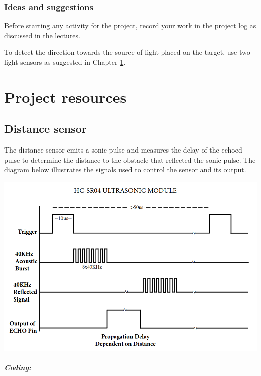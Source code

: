 \documentclass[12pt]{book}
\begin{document}
\subsection{Ideas and suggestions}

\begin{compactenum}[1)]
  \item Before starting any activity for the project, record your work
    in the project log as discussed in the lectures.
  \item To detect the direction towards the source of light placed on
    the target, use two light sensors as suggested in Chapter
    \ref{resource.ch}. 
\end{compactenum}


\chapter{Project resources}\label{resource.ch}

\section{Distance sensor}

The distance sensor emits a sonic pulse and measures the delay of the
echoed pulse to determine the distance to the obstacle that reflected
the sonic pulse. The diagram below illustrates the signals used to
control the sensor and its output.

\includegraphics[width=.7\textwidth]{figs/8-hc-sr04-timing.png}

\paragraph{Coding:}
\end{document}
